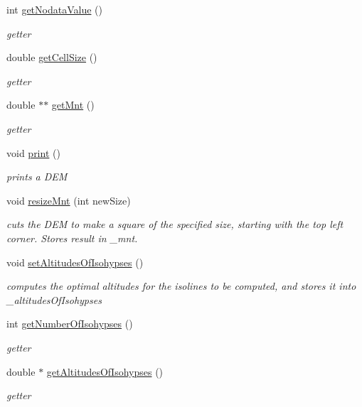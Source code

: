 \begin{DoxyCompactItemize}
int \hyperlink{classmnt_a4316ef2f545152a990af37b1d0baf342}{get\+Nodata\+Value} ()
\begin{DoxyCompactList}\small\item\em getter \end{DoxyCompactList}\item 
double \hyperlink{classmnt_a5389db8a71d75879b01aa76fac9a71eb}{get\+Cell\+Size} ()
\begin{DoxyCompactList}\small\item\em getter \end{DoxyCompactList}\item 
double $\ast$$\ast$ \hyperlink{classmnt_abbbd15d59bca64abc7a374b97717a317}{get\+Mnt} ()
\begin{DoxyCompactList}\small\item\em getter \end{DoxyCompactList}\item 
void \hyperlink{classmnt_a479074a193ec1c5d669984035da98e83}{print} ()
\begin{DoxyCompactList}\small\item\em prints a D\+E\+M \end{DoxyCompactList}\item 
void \hyperlink{classmnt_acde47c4abd14447b8e70f5d03702294b}{resize\+Mnt} (int new\+Size)
\begin{DoxyCompactList}\small\item\em cuts the D\+E\+M to make a square of the specified size, starting with the top left corner. Stores result in \+\_\+mnt. \end{DoxyCompactList}\item 
void \hyperlink{classmnt_aedbc5d1b46cfa97f366d9554fd0737ef}{set\+Altitudes\+Of\+Isohypses} ()
\begin{DoxyCompactList}\small\item\em computes the optimal altitudes for the isolines to be computed, and stores it into \+\_\+altitudes\+Of\+Isohypses \end{DoxyCompactList}\item 
int \hyperlink{classmnt_a141910258ecc57ecf8ac4efc9ce4e652}{get\+Number\+Of\+Isohypses} ()
\begin{DoxyCompactList}\small\item\em getter \end{DoxyCompactList}\item 
double $\ast$ \hyperlink{classmnt_aeb54a14efadb46ddcb27229fc328ac74}{get\+Altitudes\+Of\+Isohypses} ()
\begin{DoxyCompactList}\small\item\em getter \end{DoxyCompactList}\item 
$$
\end{DoxyCompactItemize}
